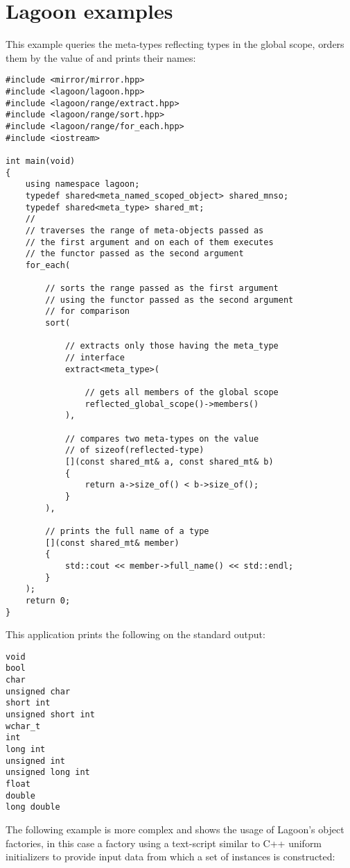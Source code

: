 \section{Lagoon examples}
\label{appendix-lagoon-examples}

This example queries the meta-types reflecting types in the global scope,
orders them by the value of \verb@sizeof@ and prints their names:

\begin{verbatim}
#include <mirror/mirror.hpp>
#include <lagoon/lagoon.hpp>
#include <lagoon/range/extract.hpp>
#include <lagoon/range/sort.hpp>
#include <lagoon/range/for_each.hpp>
#include <iostream>

int main(void)
{
    using namespace lagoon;
    typedef shared<meta_named_scoped_object> shared_mnso;
    typedef shared<meta_type> shared_mt;
    //
    // traverses the range of meta-objects passed as
    // the first argument and on each of them executes
    // the functor passed as the second argument
    for_each(

        // sorts the range passed as the first argument
        // using the functor passed as the second argument
        // for comparison
        sort(

            // extracts only those having the meta_type
            // interface
            extract<meta_type>(

                // gets all members of the global scope
                reflected_global_scope()->members()
            ),

            // compares two meta-types on the value
            // of sizeof(reflected-type)
            [](const shared_mt& a, const shared_mt& b)
            {
                return a->size_of() < b->size_of();
            }
        ),

        // prints the full name of a type
        [](const shared_mt& member)
        {
            std::cout << member->full_name() << std::endl;
        }
    );
    return 0;
}
\end{verbatim}

This application prints the following on the standard output:

\begin{verbatim}
void
bool
char
unsigned char
short int
unsigned short int
wchar_t
int
long int
unsigned int
unsigned long int
float
double
long double
\end{verbatim}

The following example is more complex and shows the usage of Lagoon's
object factories, in this case a factory using a text-script similar
to C++ uniform initializers to provide input data from which a set
of instances is constructed:

